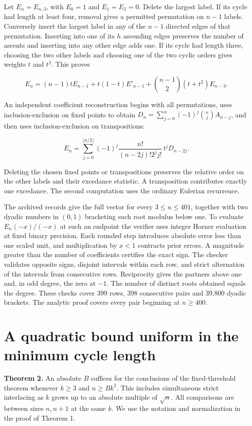 \documentclass[11pt]{article}
\begin{document}
Let $E_n=E_{n,3}$, with $E_0=1$ and $E_1=E_2=0$. Delete the largest label. If its cycle had length at least four, removal gives a permitted permutation on $n-1$ labels. Conversely insert the largest label in any of the $n-1$ directed edges of that permutation. Inserting into one of its $h$ ascending edges preserves the number of ascents and inserting into any other edge adds one. If its cycle had length three, choosing the two other labels and choosing one of the two cyclic orders gives weights $t$ and $t^2$. This proves

\[
 E_n=(n-1)tE_{n-1}+t(1-t)E'_{n-1}
       +\binom{n-1}{2}(t+t^2)E_{n-3}.
\]

An independent coefficient reconstruction begins with all permutations, uses inclusion-exclusion on fixed points to obtain $D_n=\sum_{j=0}^n(-1)^j\binom nj A_{n-j}$, and then uses inclusion-exclusion on transpositions:

\[
 E_n=\sum_{j=0}^{\lfloor n/2\rfloor}(-1)^j
       \frac{n!}{(n-2j)!2^j j!}\,t^j D_{n-2j}.
\]

Deleting the chosen fixed points or transpositions preserves the relative order on the other labels and their excedance statistic. A transposition contributes exactly one excedance. The second computation uses the ordinary Eulerian recurrence.

The archived records give the full vector for every $3\le n\le401$, together with two dyadic numbers in $(0,1)$ bracketing each root modulus below one. To evaluate $E_n(-x)/(-x)$ at such an endpoint the verifier uses integer Horner evaluation at fixed binary precision. Each rounded step introduces absolute error less than one scaled unit, and multiplication by $x<1$ contracts prior errors. A magnitude greater than the number of coefficients certifies the exact sign. The checker validates opposite signs, disjoint intervals within each row, and strict alternation of the intervals from consecutive rows. Reciprocity gives the partners above one and, in odd degree, the zero at $-1$. The number of distinct roots obtained equals the degree. These checks cover 399 rows, 398 consecutive pairs and 39,800 dyadic brackets. The analytic proof covers every pair beginning at $n\ge400$.


\section{A quadratic bound uniform in the minimum cycle length}


\textbf{Theorem 2.} An absolute $B$ suffices for the conclusions of the fixed-threshold theorem whenever $k\ge3$ and $n\ge Bk^2$. This includes simultaneous strict interlacing as $k$ grows up to an absolute multiple of $\sqrt n$. All comparisons are between sizes $n,n+1$ at the same $k$. We use the notation and normalization in the proof of Theorem 1.
\end{document}
